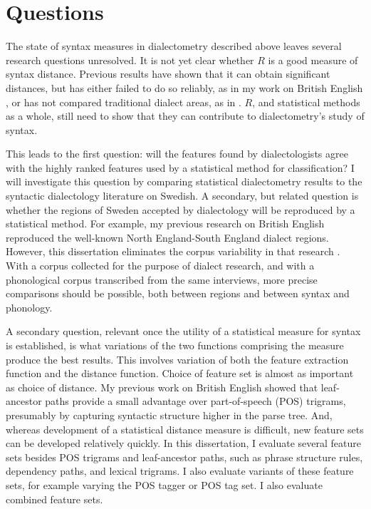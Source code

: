 \chapter{Questions}
\label{questions-chapter}


The state of syntax measures in dialectometry described above leaves
several research questions unresolved. It is not yet clear whether $R$
is a good measure of syntax distance. Previous results have shown that
it can obtain significant distances, but has either failed to do so
reliably, as in my work on British English \cite{sanders08b}, or has
not compared traditional dialect areas, as in
. $R$, and statistical methods as a whole, still
need to show that they can contribute to dialectometry's study of
syntax.

This leads to the first question: will the features found by
dialectologists agree with the highly ranked features used by a
statistical method for classification? I will investigate this
question by comparing statistical dialectometry results to the
syntactic dialectology literature on Swedish. A secondary, but related
question is whether the regions of Sweden accepted by dialectology
will be reproduced by a statistical method. For example, my previous
research on British English reproduced the well-known North
England-South England dialect regions. However, this dissertation
eliminates the corpus variability in that research
\cite{sanders08b}. With a corpus collected for the purpose of dialect
research, and with a phonological corpus transcribed from the same
interviews, more precise comparisons should be possible, both between
regions and between syntax and phonology.

A secondary question, relevant once the utility of a statistical
measure for syntax is established, is what variations of the two
functions comprising the measure produce the best results. This
involves variation of both the feature extraction function and the
distance function. Choice of feature set is almost as important as
choice of distance. My previous work on British English showed
that leaf-ancestor paths provide a small advantage over part-of-speech
(POS) trigrams, presumably by capturing syntactic structure higher in
the parse tree. And, whereas development of a statistical distance
measure is difficult, new feature sets can be developed relatively
quickly.
In this dissertation, I evaluate several feature sets besides POS trigrams and
leaf-ancestor paths, such as phrase structure rules, dependency paths,
and lexical trigrams. I also evaluate variants of these feature sets,
for example varying the POS tagger or POS tag set. I also evaluate
combined feature sets.


